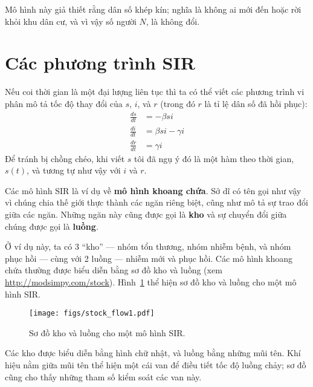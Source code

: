 \documentclass[12pt, openany]{book}
\theoremstyle{exercise}
\begin{document}
Mô hình này giả thiết rằng dân số khép kín; nghĩa là không ai mới đến hoặc rời khỏi khu dân cư, và vì vậy số người $N$, là không đổi.


\section{Các phương trình SIR}
\label{sireqn}

Nếu coi thời gian là một đại lượng liên tục thì ta có thể viết các phương trình vi phân mô tả tốc độ thay đổi của $s$, $i$, và $r$ (trong đó $r$ là tỉ lệ dân số đã hồi phục):
%
\begin{align*}
\frac{ds}{dt} &= -\beta s i \\
\frac{di}{dt} &= \beta s i - \gamma i\\
\frac{dr}{dt} &= \gamma i
\end{align*}
%
Để tránh bị chồng chéo, khi viết $s$ tôi đã ngụ ý đó là một hàm theo thời gian, $s(t)$, và tương tự như vậy với $i$ và $r$.

Các mô hình SIR là ví dụ về {\bf mô hình khoang chứa}. Sở dĩ có tên gọi như vậy vì chúng chia thế giới thực thành các ngăn riêng biệt, cũng như mô tả sự trao đổi giữa các ngăn. Những ngăn này cũng được gọi là {\bf kho} và sự chuyển đổi giữa chúng được gọi là {\bf luồng}.


Ở ví dụ này, ta có 3 ``kho'' --- nhóm tổn thương, nhóm nhiễm bệnh, và nhóm phục hồi --- cùng với 2 luồng --- nhiễm mới và phục hồi. Các mô hình khoang chứa thường được biểu diễn bằng sơ đồ kho và luồng (xem \url{http://modsimpy.com/stock}).
Hình~\ref{stock_flow1} thể hiện sơ đồ kho và luồng cho một mô hình SIR.

\begin{figure}
\centerline{\texttt{[image: figs/stock\_flow1.pdf]}}
\caption{Sơ đồ kho và luồng cho một mô hình SIR.}
\label{stock_flow1}
\end{figure}

Các kho được biểu diễn bằng hình chữ nhật, và luồng bằng những mũi tên. Khí hiệu nằm giữa mũi tên thể hiện một cái van để điều tiết tốc độ luồng chảy; sơ đồ cũng cho thấy những tham số kiểm soát các van này.
\end{document}
